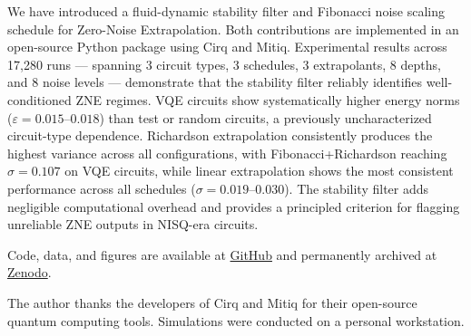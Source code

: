 \documentclass[twocolumn,showpacs,preprintnumbers,amsmath,amssymb,prl]{revtex4-2}
\newcommand{\GITHUBURL}{https://github.com/OfficialChaos/Quantum-Vortex-QEM}
\newcommand{\ZENODOID}{10.5281/zenodo.18849515}
\begin{document}
We have introduced a fluid-dynamic stability filter and Fibonacci noise
scaling schedule for Zero-Noise Extrapolation. Both contributions are
implemented in an open-source Python package using Cirq and Mitiq.
Experimental results across 17,280 runs — spanning 3 circuit types, 3 schedules, 3 extrapolants, 8 depths, and 8 noise levels — demonstrate that the stability filter reliably identifies well-conditioned ZNE regimes. VQE circuits show systematically higher energy norms ($\varepsilon = 0.015$--$0.018$) than test or random circuits, a previously uncharacterized circuit-type dependence. Richardson extrapolation consistently produces the highest variance across all configurations, with Fibonacci+Richardson reaching $\sigma = 0.107$ on VQE circuits, while linear extrapolation shows the most consistent performance across all schedules ($\sigma = 0.019$--$0.030$).
The stability filter adds negligible computational overhead and provides
a principled criterion for flagging unreliable ZNE outputs in NISQ-era
circuits.

Code, data, and figures are available at \href{\GITHUBURL}{GitHub}
and permanently archived at \href{https://doi.org/\ZENODOID}{Zenodo}.

\begin{acknowledgments}
The author thanks the developers of Cirq and Mitiq for their open-source
quantum computing tools. Simulations were conducted on a personal
workstation.
\end{acknowledgments}


\end{document}
